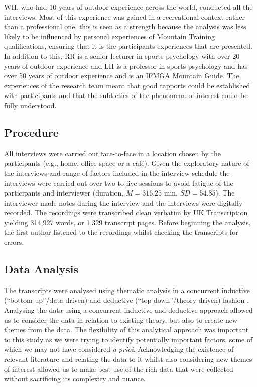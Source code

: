 \documentclass[
  12pt,
  a4paper,
]{book}
\begin{document}
WH, who had 10 years of outdoor experience across the world, conducted all the interviews. Most of this experience was gained in a recreational context rather than a professional one, this is seen as a strength because the analysis was less likely to be influenced by personal experiences of Mountain Training qualifications, ensuring that it is the participants experiences that are presented. In addition to this, RR is a senior lecturer in sports psychology with over 20 years of outdoor experience and LH is a professor in sports psychology and has over 50 years of outdoor experience and is an IFMGA Mountain Guide. The experiences of the research team meant that good rapports could be established with participants and that the subtleties of the phenomena of interest could be fully understood.

\hypertarget{procedure}{%
\subsection{Procedure}\label{procedure}}

All interviews were carried out face-to-face in a location chosen by the participants (e.g., home, office space or a café). Given the exploratory nature of the interviews and range of factors included in the interview schedule the interviews were carried out over two to five sessions to avoid fatigue of the participants and interviewer (duration, \(M = 316.25\) min, \(SD = 54.85\)). The interviewer made notes during the interview and the interviews were digitally recorded. The recordings were transcribed clean verbatim by UK Transcription yielding 314,927 words, or 1,329 transcript pages. Before beginning the analysis, the first author listened to the recordings whilst checking the transcripts for errors.

\hypertarget{data-analysis}{%
\subsection{Data Analysis}\label{data-analysis}}

The transcripts were analysed using thematic analysis in a concurrent inductive (``bottom up''/data driven) and deductive (``top down''/theory driven) fashion \citep{Braun2006}. Analysing the data using a concurrent inductive and deductive approach allowed us to consider the data in relation to existing theory, but also to create new themes from the data. The flexibility of this analytical approach was important to this study as we were trying to identify potentially important factors, some of which we may not have considered \emph{a prioi}. Acknowledging the existence of relevant literature and relating the data to it whilst also considering new themes of interest allowed us to make best use of the rich data that were collected without sacrificing its complexity and nuance.
\end{document}

